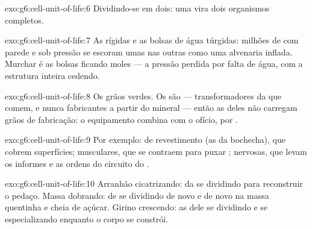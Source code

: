 \begin{solution}{exo:g6:cell-unit-of-life:6}
Dividindo-se em dois: uma  vira dois organismos completos.
\end{solution}

\begin{solution}{exo:g6:cell-unit-of-life:7}
As  rígidas e as bolsas de água túrgidas: milhões de
 com parede e sob pressão se escoram umas nas outras como uma
alvenaria inflada. Murchar é as bolsas ficando moles --- a pressão
perdida por falta de água, com a estrutura inteira cedendo.
\end{solution}

\begin{solution}{exo:g6:cell-unit-of-life:8}
Os grãos verdes. Os  são  --- transformadores da
 que comem, e nunca fabricantes a partir do mineral
--- então as  deles não carregam grãos de fabricação: o
equipamento combina com o ofício,  por .
\end{solution}

\begin{solution}{exo:g6:cell-unit-of-life:9}
Por exemplo:  de revestimento (as da bochecha), que cobrem
superfícies;  musculares, que se contraem para puxar ;
 nervosas, que levam os informes e as ordens do circuito do
.
\end{solution}

\begin{solution}{exo:g6:cell-unit-of-life:10}
Arranhão cicatrizando:  da  se dividindo para reconstruir o
pedaço. Massa dobrando:  de  se dividindo de novo e de
novo na massa quentinha e cheia de açúcar. Girino crescendo: as
 dele se dividindo e se especializando enquanto o corpo se
constrói.
\end{solution}

